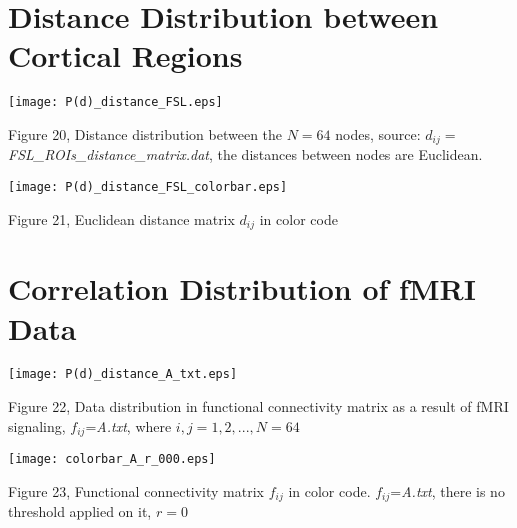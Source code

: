 \documentclass{article}
\begin{document}
\section{Distance Distribution between Cortical Regions}
\begin{center}
    \texttt{[image: P(d)\_distance\_FSL.eps]} 
	\newline
\begin{footnotesize}
 Figure 20, Distance distribution between the $N=64$ nodes, source: $d_{ij}=$\textit{FSL\_ROIs\_distance\_matrix.dat}, the distances between nodes are Euclidean.
\end{footnotesize}
\end{center}

\begin{center}
    \texttt{[image: P(d)\_distance\_FSL\_colorbar.eps]} 
	\newline
\begin{footnotesize}
 Figure 21, Euclidean distance matrix $d_{ij}$ in color code
\end{footnotesize}
\end{center}

\section{Correlation Distribution of fMRI Data}

\begin{center}
    \texttt{[image: P(d)\_distance\_A\_txt.eps]} 
	\newline
\begin{footnotesize}
 Figure 22, Data distribution in functional connectivity matrix as a result of fMRI signaling, $f_{ij}$=\textit{A.txt}, where ${i,j}=1,2,...,N=64$
\end{footnotesize}
\end{center}

\begin{center}
    \texttt{[image: colorbar\_A\_r\_000.eps]} 
	\newline
\begin{footnotesize}
 Figure 23, Functional connectivity matrix $f_{ij}$ in color code. $f_{ij}$=\textit{A.txt}, there is no threshold applied on it, $r=0$
\end{footnotesize}
\end{center}
\end{document}
